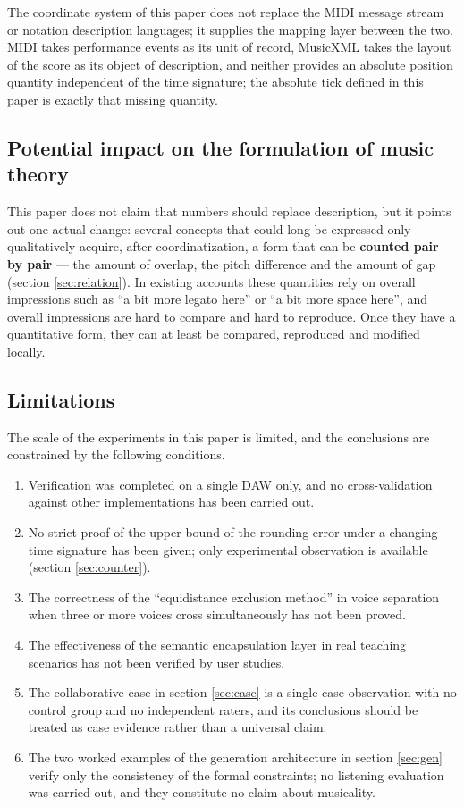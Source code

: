 \documentclass[11pt,a4paper]{article}
\begin{document}
The coordinate system of this paper does not replace the MIDI message stream or notation
description languages; it supplies the mapping layer between the two. MIDI takes
performance events as its unit of record, MusicXML takes the layout of the score as its
object of description, and neither provides an absolute position quantity independent of
the time signature; the absolute tick defined in this paper is exactly that missing
quantity.

\subsection{Potential impact on the formulation of music theory}

This paper does not claim that numbers should replace description, but it points out one
actual change: several concepts that could long be expressed only qualitatively acquire,
after coordinatization, a form that can be \textbf{counted pair by pair} --- the amount
of overlap, the pitch difference and the amount of gap (section \ref{sec:relation}). In
existing accounts these quantities rely on overall impressions such as ``a bit more
legato here'' or ``a bit more space here'', and overall impressions are hard to compare
and hard to reproduce. Once they have a quantitative form, they can at least be
compared, reproduced and modified locally.

\subsection{Limitations}

The scale of the experiments in this paper is limited, and the conclusions are
constrained by the following conditions.

\begin{enumerate}[leftmargin=2.2em,itemsep=0.15em,topsep=0.2em]
  \item Verification was completed on a single DAW only, and no cross-validation
        against other implementations has been carried out.
  \item No strict proof of the upper bound of the rounding error under a changing time
        signature has been given; only experimental observation is available
        (section \ref{sec:counter}).
  \item The correctness of the ``equidistance exclusion method'' in voice separation
        when three or more voices cross simultaneously has not been proved.
  \item The effectiveness of the semantic encapsulation layer in real teaching scenarios
        has not been verified by user studies.
  \item The collaborative case in section \ref{sec:case} is a single-case observation
        with no control group and no independent raters, and its conclusions should be
        treated as case evidence rather than a universal claim.
  \item The two worked examples of the generation architecture in section \ref{sec:gen}
        verify only the consistency of the formal constraints; no listening evaluation
        was carried out, and they constitute no claim about musicality.
\end{enumerate}
\end{document}
